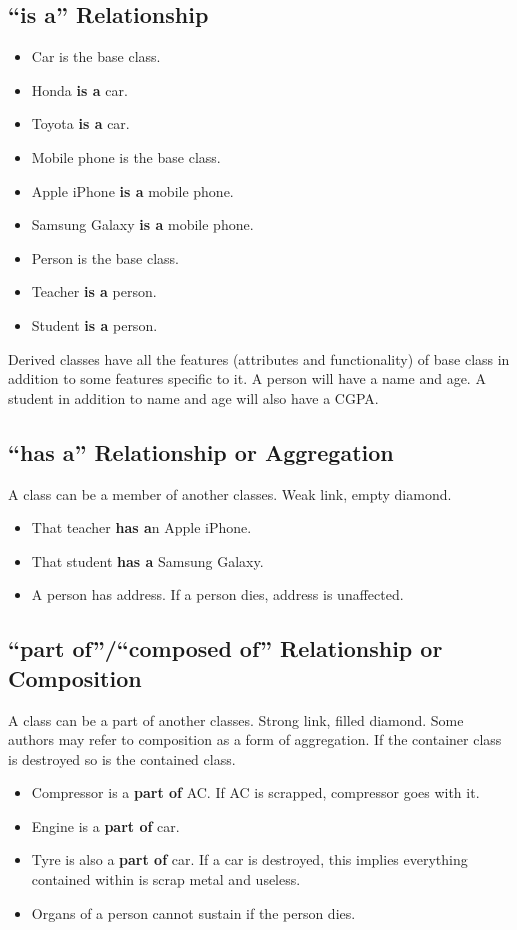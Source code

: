 \documentclass[12pt,a4paper]{article}
\begin{document}
\subsection{``is a'' Relationship}
\begin{itemize}
\item Car is the base class.
\item Honda \textbf{is a} car.
\item Toyota \textbf{is a} car.
\end{itemize}
\begin{itemize}
\item Mobile phone is the base class.
\item Apple iPhone \textbf{is a} mobile phone.
\item Samsung Galaxy \textbf{is a} mobile phone.
\end{itemize}
\begin{itemize}
\item Person is the base class.
\item Teacher \textbf{is a} person.
\item Student \textbf{is a} person.
\end{itemize}
Derived classes have all the features (attributes and functionality) of base class in addition to some features specific to it. A person will have a name and age. A student in addition to name and age will also have a CGPA.
\subsection{``has a'' Relationship or Aggregation}
A class can be a member of another classes. Weak link, empty diamond.
\begin{itemize}
\item That teacher \textbf{has a}n Apple iPhone.
\item That student \textbf{has a} Samsung Galaxy.
\item A person has address. If a person dies, address is unaffected.
\end{itemize}
\subsection{``part of''/``composed of'' Relationship or Composition}
A class can be a part of another classes. Strong link, filled diamond. Some authors may refer to composition as a form of aggregation. If the container class is destroyed so is the contained class.
\begin{itemize}
\item Compressor is a \textbf{part of} AC. If AC is scrapped, compressor goes with it.
\item Engine is a \textbf{part of} car. 
\item Tyre is also a \textbf{part of} car. If a car is destroyed, this implies everything contained within is scrap metal and useless.
\item Organs of a person cannot sustain if the person dies.
\end{itemize}
\nocite{*}


\end{document}
